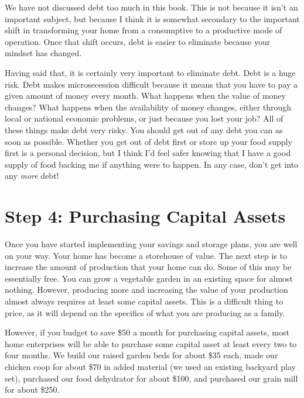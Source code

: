 \begin{infonote}

We have not discussed debt too much in this book. This is not because it
isn't an important subject, but because I think it is
somewhat secondary to the important shift in transforming your home
from a consumptive to a productive mode of operation. Once that shift
occurs, debt is easier to eliminate because your mindset has changed. 

Having said that, it is certainly very important to eliminate debt. Debt
is a huge risk. Debt makes microsecession difficult because it means that you have to pay a given amount of money
every month. What happens when the value of money changes?  What
happens when the availability of money changes, either through local or
national economic problems, or just because you lost your job?  All of
these things make debt very risky. You should get out of any debt you
can as soon as possible. Whether you get out of debt first or store up
your food supply first is a personal decision, but I think
I'd feel safer knowing that I have a good supply of
food backing me if anything were to happen. In any case,
don't get into any \textit{more} debt!

\end{infonote}

\section{Step 4: Purchasing Capital Assets}

Once you have started implementing your savings and storage plans, you
are well on your way. Your home has become a storehouse of value. The
next step is to increase the amount of production that your home can
do. Some of this may be essentially free. You can grow a vegetable
garden in an existing space for almost nothing. However, producing more
and increasing the value of your production almost always requires at
least some capital assets. This is a difficult thing to price, as it
will depend on the specifics of what you are producing as a family.

However, if you budget to save \$50 a month for purchasing capital
assets, most home enterprises will be able to purchase some capital
asset at least every two to four months. We build our raised garden
beds for about \$35 each, made our chicken coop for about \$70 in added
material (we used an existing backyard play set), purchased our food
dehydrator for about \$100, and purchased our grain mill for about
\$250. 

